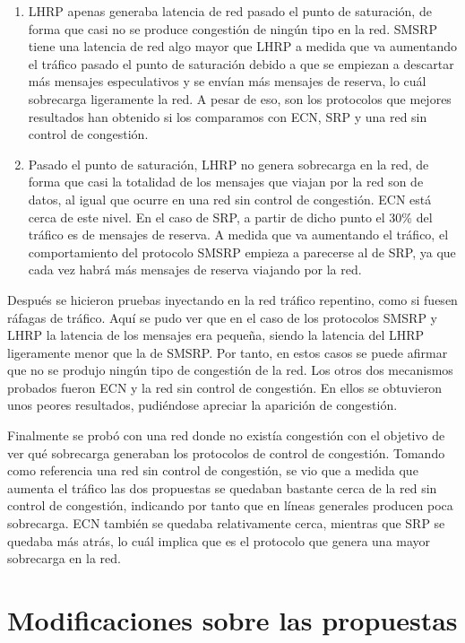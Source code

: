 \documentclass[11pt,a4paper]{article}
\begin{document}
\begin{enumerate}
	\item LHRP apenas generaba latencia de red pasado el punto de saturación, de forma
	que casi no se produce congestión de ningún tipo en la red. SMSRP tiene una latencia de
	red algo mayor que LHRP a medida que va aumentando el tráfico pasado el punto de
	saturación debido a que se empiezan a descartar más mensajes especulativos y se envían
	más mensajes de reserva, lo cuál sobrecarga ligeramente la red. A pesar
	de eso, son los protocolos que mejores resultados han obtenido si los comparamos con ECN,
	SRP y una red sin control de congestión.
	\item Pasado el punto de saturación, LHRP no genera sobrecarga en la red, de forma que casi
	la totalidad de los mensajes que viajan por la red son de datos, al igual que ocurre en una
	red sin control de congestión. ECN está cerca de este nivel. En el caso de SRP, a partir
	de dicho punto el 30\% del tráfico es de mensajes de reserva. A medida que va aumentando
	el tráfico, el comportamiento del protocolo SMSRP empieza a parecerse al de SRP, ya que
	cada vez habrá más mensajes de reserva viajando por la red.	
\end{enumerate}

Después se hicieron pruebas inyectando en la red tráfico repentino, como si fuesen ráfagas
de tráfico. Aquí se pudo ver que en el caso de los protocolos SMSRP y LHRP la latencia de
los mensajes era pequeña, siendo la latencia del LHRP ligeramente menor que la de SMSRP. Por
tanto, en estos casos se puede afirmar que no se produjo ningún tipo de congestión de la red. Los
otros dos mecanismos probados fueron ECN y la red sin control de congestión. En ellos se
obtuvieron unos peores resultados, pudiéndose apreciar la aparición de congestión.

Finalmente se probó con una red donde no existía congestión con el objetivo de ver qué sobrecarga
generaban los protocolos de control de congestión. Tomando como referencia una red sin control
de congestión, se vio que a medida que aumenta el tráfico las dos propuestas se quedaban
bastante cerca de la red sin control de congestión, indicando por tanto que en líneas generales
producen poca sobrecarga. ECN también se quedaba relativamente cerca, mientras que SRP se quedaba
más atrás, lo cuál implica que es el protocolo que genera una mayor sobrecarga en la red.

\section{Modificaciones sobre las propuestas}
\end{document}
